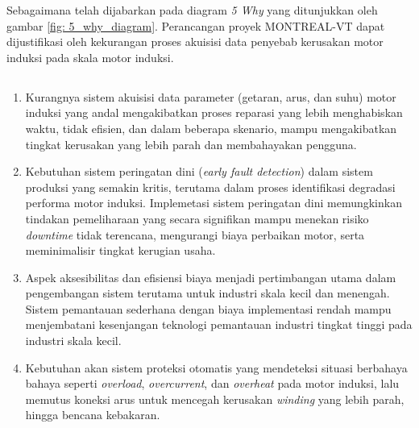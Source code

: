\documentclass{elsinta}
\begin{document}
Sebagaimana telah dijabarkan pada diagram \textit{5 Why} yang
ditunjukkan oleh gambar \ref{fig: 5_why_diagram}. Perancangan
proyek MONTREAL-VT dapat dijustifikasi oleh kekurangan
proses akuisisi data penyebab kerusakan motor induksi pada skala
motor induksi.  %


\subsection{\ProjectUrgencyTitle}
\begin{enumerate}
    \item   Kurangnya sistem akuisisi data parameter 
            (getaran, arus, dan suhu) motor induksi yang
            andal mengakibatkan proses reparasi yang lebih
            menghabiskan waktu, tidak efisien, dan dalam beberapa skenario,
            mampu mengakibatkan tingkat kerusakan yang lebih parah dan
            membahayakan pengguna.
    \item   Kebutuhan sistem peringatan dini (\textit{early fault detection})
            dalam sistem produksi yang semakin
            kritis, terutama dalam proses identifikasi
            degradasi performa motor induksi. Implemetasi
            sistem peringatan dini memungkinkan tindakan
            pemeliharaan yang secara signifikan mampu
            menekan risiko \textit{downtime} tidak terencana,
            mengurangi biaya perbaikan motor, serta
            meminimalisir tingkat kerugian usaha.
    \item   Aspek aksesibilitas dan efisiensi biaya menjadi
            pertimbangan utama dalam pengembangan sistem
            terutama untuk industri skala kecil dan menengah.
            Sistem pemantauan sederhana dengan biaya implementasi
            rendah mampu menjembatani kesenjangan teknologi
            pemantauan industri tingkat tinggi pada industri
            skala kecil.
    \item   Kebutuhan akan sistem proteksi otomatis yang
            mendeteksi situasi berbahaya bahaya seperti
            \textit{overload},
            \textit{overcurrent}, dan \textit{overheat} pada motor induksi,
            lalu memutus koneksi arus untuk mencegah kerusakan \textit{winding}
            yang lebih parah, hingga bencana kebakaran.
\end{enumerate}
\end{document}
